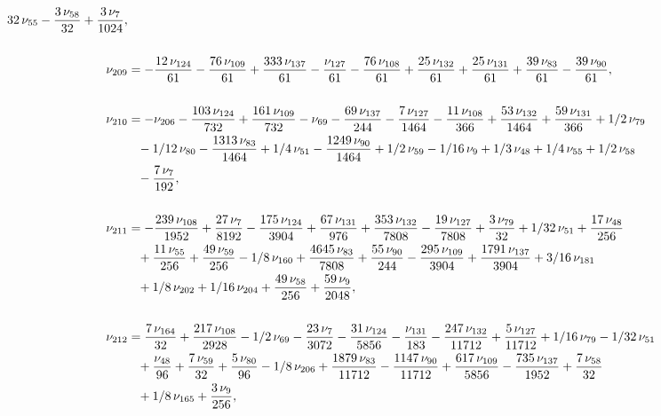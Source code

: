\documentclass[a4paper,12pt, DIV=14, BCOR=5mm, twoside, headsepline, numbers=noenddot]{scrbook}
\begin{document}
\begin{align}
\begin{aligned}
32\,\nu_{{55}}-{\frac {3\,\nu_{{58}}}{32}}+{\frac {3\,\nu_{{7}}}{1024}
}, \\
\\
\nu_{{209}}&=-{\frac {12\,\nu_{{124}}}{61}}-{\frac {76\,\nu_{{109}}}{
61}}+{\frac {333\,\nu_{{137}}}{61}}-{\frac {\nu_{{127}}}{61}}-{\frac {
76\,\nu_{{108}}}{61}}+{\frac {25\,\nu_{{132}}}{61}}+{\frac {25\,\nu_{{
131}}}{61}}+{\frac {39\,\nu_{{83}}}{61}}-{\frac {39\,\nu_{{90}}}{61}},\\
\\
\nu_{{210}}&=-\nu_{{206}}-{\frac {103\,\nu_{{124}}}{732}}+{\frac {161\,
\nu_{{109}}}{732}}-\nu_{{69}}-{\frac {69\,\nu_{{137}}}{244}}-{\frac {7
\,\nu_{{127}}}{1464}}-{\frac {11\,\nu_{{108}}}{366}}+{\frac {53\,\nu_{
{132}}}{1464}}+{\frac {59\,\nu_{{131}}}{366}}+1/2\,\nu_{{79}}\\
 &\hphantom{=}-1/12\,
\nu_{{80}}-{\frac {1313\,\nu_{{83}}}{1464}}+1/4\,\nu_{{51}}-{\frac {
1249\,\nu_{{90}}}{1464}}+1/2\,\nu_{{59}}-1/16\,\nu_{{9}}+1/3\,\nu_{{48
}}+1/4\,\nu_{{55}}+1/2\,\nu_{{58}}\\
 &\hphantom{=}-{\frac {7\,\nu_{{7}}}{192}}, \\
\\
\nu_{{
211}}&=-{\frac {239\,\nu_{{108}}}{1952}}+{\frac {27\,\nu_{{7}}}{8192}}-
{\frac {175\,\nu_{{124}}}{3904}}+{\frac {67\,\nu_{{131}}}{976}}+{
\frac {353\,\nu_{{132}}}{7808}}-{\frac {19\,\nu_{{127}}}{7808}}+{
\frac {3\,\nu_{{79}}}{32}}+1/32\,\nu_{{51}}+{\frac {17\,\nu_{{48}}}{
256}}\\
 &\hphantom{=}+{\frac {11\,\nu_{{55}}}{256}}+{\frac {49\,\nu_{{59}}}{256}}-1/8
\,\nu_{{160}}+{\frac {4645\,\nu_{{83}}}{7808}}+{\frac {55\,\nu_{{90}}
}{244}}-{\frac {295\,\nu_{{109}}}{3904}}+{\frac {1791\,\nu_{{137}}}{
3904}}+3/16\,\nu_{{181}}\\
 &\hphantom{=}+1/8\,\nu_{{202}}+1/16\,\nu_{{204}}+{\frac {49
\,\nu_{{58}}}{256}}+{\frac {59\,\nu_{{9}}}{2048}}, \\
\\
\nu_{{212}}&={\frac {
7\,\nu_{{164}}}{32}}+{\frac {217\,\nu_{{108}}}{2928}}-1/2\,\nu_{{69}}-
{\frac {23\,\nu_{{7}}}{3072}}-{\frac {31\,\nu_{{124}}}{5856}}-{\frac {
\nu_{{131}}}{183}}-{\frac {247\,\nu_{{132}}}{11712}}+{\frac {5\,\nu_{{
127}}}{11712}}+1/16\,\nu_{{79}}-1/32\,\nu_{{51}}\\
 &\hphantom{=}+{\frac {\nu_{{48}}}{
96}}+{\frac {7\,\nu_{{59}}}{32}}+{\frac {5\,\nu_{{80}}}{96}}-1/8\,\nu_
{{206}}+{\frac {1879\,\nu_{{83}}}{11712}}-{\frac {1147\,\nu_{{90}}}{
11712}}+{\frac {617\,\nu_{{109}}}{5856}}-{\frac {735\,\nu_{{137}}}{
1952}}+{\frac {7\,\nu_{{58}}}{32}}\\
 &\hphantom{=}+1/8\,\nu_{{165}}+{\frac {3\,\nu_{{9
}}}{256}}, 
\end{aligned}
\end{align}
\end{document}
